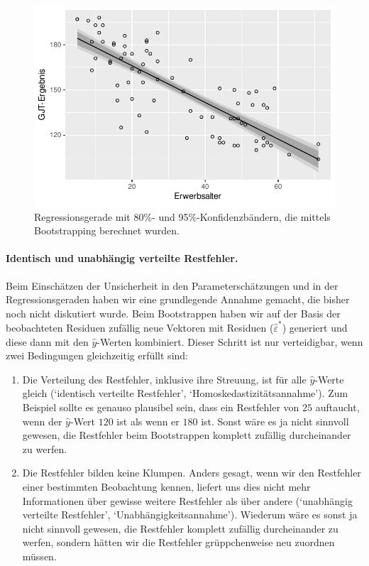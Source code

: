 \documentclass[oneside, 10pt]{book}\usepackage[]{graphicx}\usepackage[]{xcolor}
\newenvironment{knitrout}{}{} %
\begin{document}
\begin{knitrout}
\begin{figure}[tp]
{\centering \includegraphics[width=.7\textwidth]{figs/unnamed-chunk-221-1} 

}

\caption{Regressionsgerade mit 80\%- und 95\%-Konfidenzbändern, die mittels Bootstrapping berechnet wurden.\label{fig:btstrpconfidenceband}}\label{fig:unnamed-chunk-221}
\end{figure}

\end{knitrout}

\paragraph{Identisch und unabhängig verteilte Restfehler.}
 Beim Einschätzen der Unsicherheit in den Parameterschätzungen
 und in der Regressionsgeraden haben wir eine grundlegende Annahme
 gemacht, die bisher noch nicht diskutiert wurde.
 Beim Bootstrappen haben wir auf der Basis der beobachteten
 Residuen zufällig neue Vektoren mit Residuen ($\widehat{\varepsilon}^{*}$) generiert
 und diese dann mit den $\widehat{y}$-Werten kombiniert.
 Dieser Schritt ist nur verteidigbar, wenn zwei Bedingungen gleichzeitig
 erfüllt sind:
 \begin{enumerate}
 \item Die Verteilung des Restfehler, inklusive ihre Streuung,
 ist für alle $\widehat{y}$-Werte gleich (`identisch verteilte Restfehler',
 `Homoskedastizitätsannahme'). \label{homoskedasticity}
 Zum Beispiel sollte es genauso plausibel sein, dass ein Restfehler
 von $25$ auftaucht, wenn der $\widehat{y}$-Wert $120$ ist als
 wenn er $180$ ist. Sonst wäre es ja nicht sinnvoll gewesen, die Restfehler
 beim Bootstrappen komplett zufällig durcheinander zu werfen.

 \item Die Restfehler bilden keine Klumpen. Anders gesagt, wenn wir
 den Restfehler einer bestimmten Beobachtung kennen, liefert uns
 dies nicht mehr Informationen über gewisse weitere Restfehler als über
 andere (`unabhängig verteilte Restfehler', `Unabhängigkeitsannahme').
 Wiederum wäre es sonst ja nicht
 sinnvoll gewesen, die Restfehler komplett zufällig durcheinander zu werfen,
 sondern hätten wir die Restfehler grüppchenweise neu zuordnen müssen.
 \end{enumerate}
\end{document}
